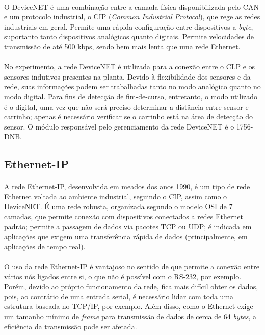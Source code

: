 \paragraph{}O DeviceNET é uma combinação entre a camada física disponibilizada pelo CAN e um protocolo industrial, o CIP (\textit{Common Industrial Protocol}), que rege as redes industriais em geral. Permite uma rápida configuração entre dispositivos a \textit{byte}, suportanto tanto dispositivos analógicos quanto digitais. Permite velocidades de transmissão de até 500 kbps, sendo bem mais lenta que uma rede Ethernet.
\paragraph{}No experimento, a rede DeviceNET é utilizada para a conexão entre o CLP e os sensores indutivos presentes na planta. Devido à flexibilidade dos sensores e da rede, suas informações podem ser trabalhadas tanto no modo analógico quanto no modo digital. Para fins de detecção de fim-de-curso, entretanto, o modo utilizado é o digital, uma vez que não será preciso determinar a distância entre sensor e carrinho; apenas é necessário verificar se o carrinho está na área de detecção do sensor. O módulo responsável pelo gerenciamento da rede DeviceNET é o 1756-DNB.

\begin{comment}
https://en.wikipedia.org/wiki/DeviceNet
http://ab.rockwellautomation.com/Networks-and-Communications/DeviceNet-Network
http://www.rtaautomation.com/technologies/devicenet/
https://www.odva.org/Portals/0/Library/Publications_Numbered/PUB00122R1_CIP_Brochure_ENGLISH.pdf
\end{comment}

\subsection{Ethernet-IP}
\paragraph{}A rede Ethernet-IP, desenvolvida em meados dos anos 1990, é um tipo de rede Ethernet voltada ao ambiente industrial, seguindo o CIP, assim como o DeviceNET. É uma rede robusta, organizada segundo o modelo OSI de 7 camadas, que permite conexão com dispositivos conectados a redes Ethernet padrão; permite a passagem de dados via pacotes TCP ou UDP; é indicada em aplicações que exigem uma transferência rápida de dados (principalmente, em aplicações de tempo real).
\paragraph{}O uso da rede Ethernet-IP é vantajoso no sentido de que permite a conexão entre vários nós ligados entre si, o que não é possível com o RS-232, por exemplo. Porém, devido ao próprio funcionamento da rede, fica mais difícil obter os dados, pois, ao contrário de uma entrada serial, é necessário lidar com toda uma estrutura baseada no TCP/IP, por exemplo. Além disso, como o Ethernet exige um tamanho mínimo de \textit{frame} para transmissão de dados de cerca de 64 \textit{bytes}, a eficiência da transmissão pode ser afetada.

